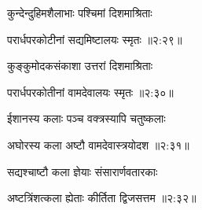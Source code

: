 {\devanagarifont कुन्देन्दुहिमशैलाभाः पश्चिमां दिशमाश्रिताः \thinspace{\dandab} \dontdisplaylinenum }%


{\devanagarifont परार्धपरकोटीनां सद्यमिष्टालयः स्मृतः {॥२:२९॥} \veg\dontdisplaylinenum }%

{\devanagarifont कुङ्कुमोदकसंकाशा उत्तरां दिशमाश्रिताः \thinspace{\dandab} \dontdisplaylinenum }%


{\devanagarifont परार्धपरकोतीनां वामदेवालयः स्मृतः {॥२:३०॥} \veg\dontdisplaylinenum }%

{\devanagarifont ईशानस्य कलाः पञ्च वक्त्रस्यापि चतुष्कलाः \thinspace{\dandab} \dontdisplaylinenum }%


{\devanagarifont अघोरस्य कला अष्टौ वामदेवास्त्रयोदश {॥२:३१॥} \veg\dontdisplaylinenum }%

{\devanagarifont सद्यश्चाष्टौ कला ज्ञेयाः संसारार्णवतारकाः \thinspace{\dandab} \dontdisplaylinenum }%


{\devanagarifont अष्टत्रिंशत्कला ह्येताः कीर्तिता द्विजसत्तम {॥२:३२॥} \veg\dontdisplaylinenum }%

